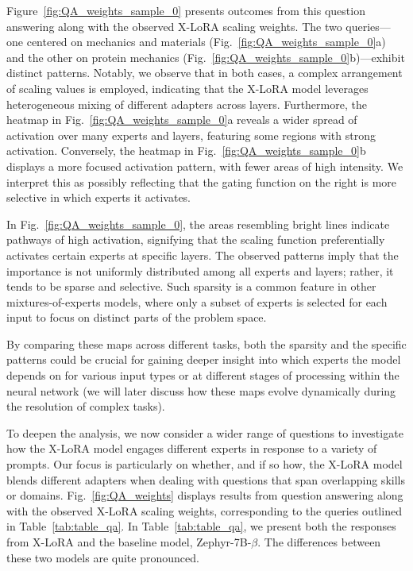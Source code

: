 Figure~\ref{fig:QA_weights_sample_0} presents outcomes from this question answering along with the observed X-LoRA scaling weights. The two queries—one centered on mechanics and materials (Fig.~\ref{fig:QA_weights_sample_0}a) and the other on protein mechanics (Fig.~\ref{fig:QA_weights_sample_0}b)—exhibit distinct patterns. Notably, we observe that in both cases, a complex arrangement of scaling values is employed, indicating that the X-LoRA model leverages heterogeneous mixing of different adapters across layers. Furthermore, the heatmap in Fig.~\ref{fig:QA_weights_sample_0}a reveals a wider spread of activation over many experts and layers, featuring some regions with strong activation. Conversely, the heatmap in Fig.~\ref{fig:QA_weights_sample_0}b displays a more focused activation pattern, with fewer areas of high intensity. We interpret this as possibly reflecting that the gating function on the right is more selective in which experts it activates.

In Fig.~\ref{fig:QA_weights_sample_0}, the areas resembling bright lines indicate pathways of high activation, signifying that the scaling function preferentially activates certain experts at specific layers. The observed patterns imply that the importance is not uniformly distributed among all experts and layers; rather, it tends to be sparse and selective. Such sparsity is a common feature in other mixtures-of-experts models, where only a subset of experts is selected for each input to focus on distinct parts of the problem space.

By comparing these maps across different tasks, both the sparsity and the specific patterns could be crucial for gaining deeper insight into which experts the model depends on for various input types or at different stages of processing within the neural network (we will later discuss how these maps evolve dynamically during the resolution of complex tasks).

To deepen the analysis, we now consider a wider range of questions to investigate how the X-LoRA model engages different experts in response to a variety of prompts. Our focus is particularly on whether, and if so how, the X-LoRA model blends different adapters when dealing with questions that span overlapping skills or domains. Fig.~\ref{fig:QA_weights} displays results from question answering along with the observed X-LoRA scaling weights, corresponding to the queries outlined in Table~\ref{tab:table_qa}. In Table~\ref{tab:table_qa}, we present both the responses from X-LoRA and the baseline model, Zephyr-7B-$\beta$. The differences between these two models are quite pronounced.

